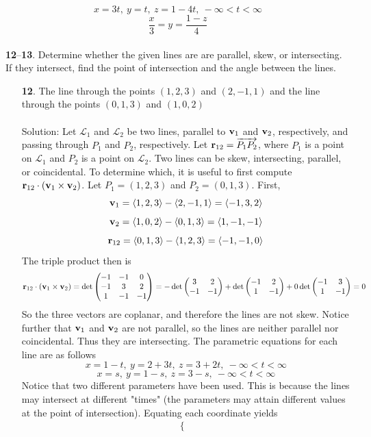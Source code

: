 \documentclass[12pt]{amsbook}
\newcommand{\la}{\langle}
\newcommand{\ra}{\rangle}
\begin{document}
$$x=3t, \ y=t, \ z=1-4t, \ -\infty<t<\infty$$
$$\frac{x}{3}=y=\frac{1-z}{4}$$
\\
{\small\bf 12}--{\small\bf 13}. Determine whether the given lines
are are parallel, skew, or intersecting. If they
intersect, find the point of intersection and the angle between the lines.
\begin{enumerate}
\item[{\small\bf 12}.]  The line through the points $(1,2,3)$ and $(2,-1,1)$
and the line through the points $(0,1,3)$ and
$(1,0,2)$ \\
\\
{\sc Solution}: Let $\mathcal{L}_1$ and $\mathcal{L}_2$ be two lines, parallel to ${\bf v}_1$ and ${\bf v}_2$, respectively, and passing through $P_1$ and $P_2$, respectively. Let ${\bf r}_{12}=\overrightarrow{P_1P_2}$, where $P_1$ is a point on $\mathcal{L}_1$ and $P_2$ is a point on $\mathcal{L}_2$. Two lines can be skew, intersecting, parallel, or coincidental. To determine which, it is useful to first compute ${\bf r}_{12}\cdot({\bf v}_1\times{\bf v}_2)$. Let $P_1=(1,2,3)$ and $P_2=(0,1,3)$. First,
$${\bf v}_1=\la 1,2,3 \ra - \la 2,-1,1 \ra = \la -1, 3, 2 \ra$$
$${\bf v}_2=\la 1,0,2 \ra - \la 0,1,3 \ra = \la 1,-1,-1\ra$$
$${\bf r}_{12}=\la 0,1,3 \ra - \la 1,2,3 \ra = \la -1,-1,0\ra$$
The triple product then is
$${\bf r}_{12}\cdot({\bf v}_1\times{\bf v}_2)=\det
\begin{pmatrix}
-1 & -1 & 0\cr -1&3&2\cr 1&-1&-1 \end{pmatrix}=-\det\begin{pmatrix}3&2\cr -1&-1  \end{pmatrix}+\det\begin{pmatrix}-1&2\cr 1&-1  \end{pmatrix}+0\det\begin{pmatrix}-1&3\cr 1&-1 \end{pmatrix}=0 $$
So the three vectors are coplanar, and therefore the lines are not skew. Notice further that ${\bf v}_1$ and ${\bf v}_2$ are not parallel, so the lines are neither parallel nor coincidental. Thus they are intersecting. The parametric equations for each line are as follows
$$x=1-t, \ y=2+3t, \ z=3+2t, \ -\infty<t<\infty$$
$$x=s, \ y=1-s, \ z=3-s, \ -\infty<t<\infty$$
Notice that two different parameters have been used. This is because the lines may intersect at different "times" (the parameters may attain different values at the point of intersection). Equating each coordinate yields
\begin{eqnarray*}
\left\{
\begin{array}{rcl}

\end{array}
\end{eqnarray*}
\end{enumerate}
\end{document}
